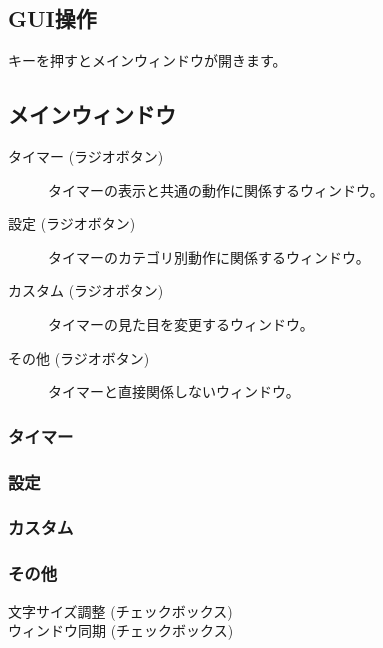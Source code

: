 \documentclass[lualatex,a4paper,fontsize=11pt,jafontscale=0.9247,titlepage,oneside]{jlreq}
\begin{document}
\subsection{GUI操作}
キーを押すとメインウィンドウが開きます。
\subsection{メインウィンドウ}
\begin{description}
\item[\textbullet タイマー (ラジオボタン)]タイマーの表示と共通の動作に関係するウィンドウ。
\item[\textbullet 設定 (ラジオボタン)]タイマーのカテゴリ別動作に関係するウィンドウ。
\item[\textbullet カスタム (ラジオボタン)]タイマーの見た目を変更するウィンドウ。
\item[\textbullet その他 (ラジオボタン)]タイマーと直接関係しないウィンドウ。
\end{description}
\subsubsection{タイマー}
\begin{description}
\item[\textbullet ]
\item[\textbullet ]
\end{description}
\subsubsection{設定}
\begin{description}
\item[\textbullet ]
\item[\textbullet ]
\end{description}
\subsubsection{カスタム}
\begin{description}
\item[\textbullet ]
\item[\textbullet ]
\end{description}
\subsubsection{その他}
\begin{description}
\item[\textbullet 文字サイズ調整 (チェックボックス)]
\item[\textbullet ウィンドウ同期 (チェックボックス)]
\end{description}
\end{document}
